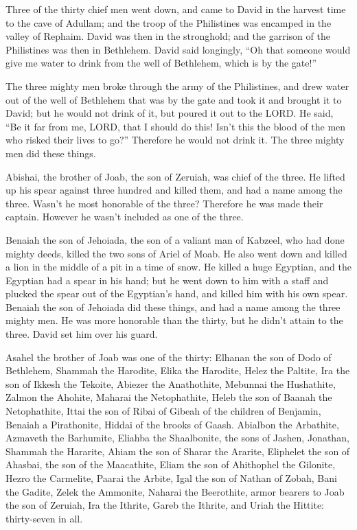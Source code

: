 \myverse{}Three of the thirty chief men went down, and came to David in
the harvest time to the cave of Adullam; and the troop of the Philistines was encamped in the valley of
Rephaim.
\myverse{}David was then in the stronghold; and the garrison of the Philistines was
then in Bethlehem.
\myverse{}David said longingly, “Oh that someone would give me water to drink from
the well of Bethlehem, which is by the gate!”

\myverse{}The three mighty men broke through the army of the Philistines,
and drew water out of the well of Bethlehem that was by the gate and took it and brought it to David;
but he would not drink of it, but poured it out to the LORD.
\myverse{}He said, “Be it far from me, LORD, that I should do this! Isn’t this the
blood of the men who risked their lives to go?” Therefore he would not drink it. The three mighty men
did these things.

\myverse{}Abishai, the brother of Joab, the son of Zeruiah, was chief
of the three. He lifted up his spear against three hundred and killed them, and had a name among the three.
\myverse{}Wasn’t he most honorable of the three? Therefore he was made their captain.
However he wasn’t included as one of the three.

\myverse{}Benaiah the son of Jehoiada, the son of a valiant man of Kabzeel,
who had done mighty deeds, killed the two sons of Ariel of Moab. He also went down and killed a lion in
the middle of a pit in a time of snow.
\myverse{}He killed a huge Egyptian, and the Egyptian had a spear in his hand; but
he went down to him with a staff and plucked the spear out of the Egyptian’s hand, and killed him with
his own spear.
\myverse{}Benaiah the son of Jehoiada did these things, and had a name among the three
mighty men.
\myverse{}He was more honorable than the thirty, but he didn’t attain to the three.
David set him over his guard.

\myverse{}Asahel the brother of Joab was one of the thirty: Elhanan the
son of Dodo of Bethlehem,
\myverse{}Shammah the Harodite, Elika the Harodite,
\myverse{}Helez the Paltite, Ira the son of Ikkesh the Tekoite,
\myverse{}Abiezer the Anathothite, Mebunnai the Hushathite,
\myverse{}Zalmon the Ahohite, Maharai the Netophathite,
\myverse{}Heleb the son of Baanah the Netophathite, Ittai the son of Ribai of Gibeah
of the children of Benjamin,
\myverse{}Benaiah a Pirathonite, Hiddai of the brooks of Gaash.
\myverse{}Abialbon the Arbathite, Azmaveth the Barhumite,
\myverse{}Eliahba the Shaalbonite, the sons of Jashen, Jonathan,
\myverse{}Shammah the Hararite, Ahiam the son of Sharar the Ararite,
\myverse{}Eliphelet the son of Ahasbai, the son of the Maacathite, Eliam the son of
Ahithophel the Gilonite,
\myverse{}Hezro the Carmelite, Paarai the Arbite,
\myverse{}Igal the son of Nathan of Zobah, Bani the Gadite,
\myverse{}Zelek the Ammonite, Naharai the Beerothite, armor bearers to Joab the son
of Zeruiah,
\myverse{}Ira the Ithrite, Gareb the Ithrite,
\myverse{}and Uriah the Hittite: thirty-seven in all.


